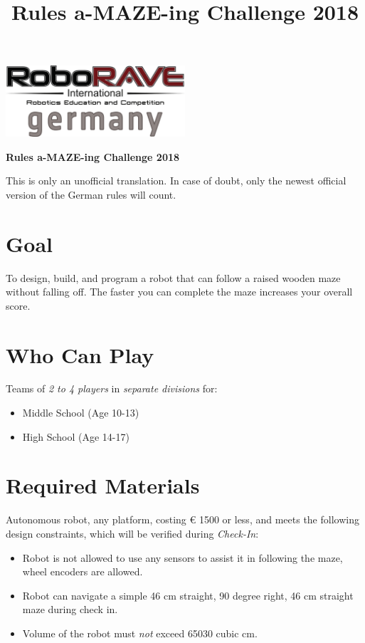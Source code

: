 \documentclass[a4paper,12pt]{article}
\begin{document}
\title{Rules a-MAZE-ing Challenge 2018}

 \begin{center}
\includegraphics[width=0.5\textwidth]{logo.png}

\huge \bfseries Rules a-MAZE-ing Challenge 2018
  \end{center}
  This is only an unofficial translation. In case of doubt, only the newest official version of the German rules will
  count.
\section{Goal}
To design, build, and program a robot that can follow a raised wooden maze without falling off. The faster you
can complete the maze increases your overall score.
\section{Who Can Play}
Teams of \emph{2 to 4 players} in \emph{separate divisions} for:
\begin{itemize}
	\item Middle School (Age 10-13)
	\item High School (Age 14-17)
\end{itemize}
\section{Required Materials}
Autonomous robot, any platform, costing \euro{ 1500} or less, and meets the following design constraints,
which will be verified during
 \emph{Check-In}:
\begin{itemize}
\item Robot is not allowed to use any sensors to assist it in following the maze, wheel encoders are allowed.
\item Robot can navigate a simple 46 cm straight, 90 degree right, 46 cm straight maze during check in.
\item Volume of the robot must \emph{not} exceed 65030 cubic cm.
\end{itemize}
\end{document}
